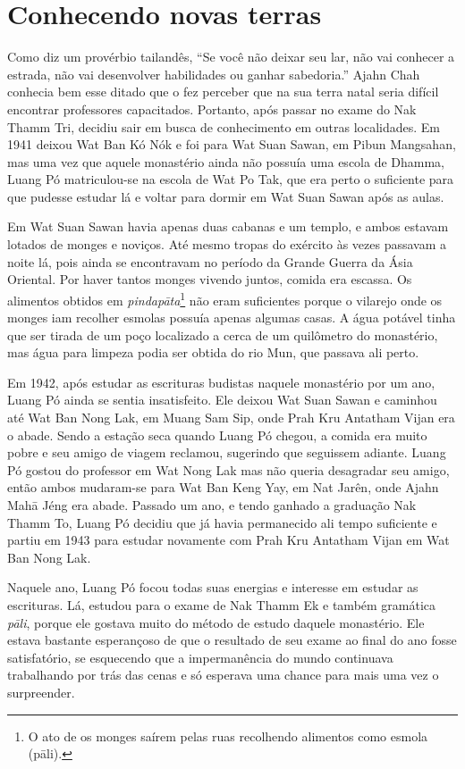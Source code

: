 \chapter{Conhecendo novas terras}

Como diz um provérbio tailandês, ``Se você não deixar seu lar, não vai
conhecer a estrada, não vai desenvolver habilidades ou ganhar
sabedoria.'' Ajahn Chah conhecia bem esse ditado que o fez perceber que
na sua terra natal seria difícil encontrar professores capacitados.
Portanto, após passar no exame do Nak Thamm Tri, decidiu sair em busca
de conhecimento em outras localidades. Em 1941 deixou Wat Ban Kó Nók e
foi para Wat Suan Sawan, em Pibun Mangsahan, mas uma vez que aquele
monastério ainda não possuía uma escola de Dhamma, Luang Pó
matriculou-se na escola de Wat Po Tak, que era perto o suficiente para
que pudesse estudar lá e voltar para dormir em Wat Suan Sawan após as
aulas.

Em Wat Suan Sawan havia apenas duas cabanas e um templo, e ambos estavam
lotados de monges e noviços. Até mesmo tropas do exército às vezes
passavam a noite lá, pois ainda se encontravam no período da Grande
Guerra da Ásia Oriental. Por haver tantos monges vivendo juntos, comida
era escassa. Os alimentos obtidos em \emph{pindapāta}\footnote{O ato de
  os monges saírem pelas ruas recolhendo alimentos como esmola (pāli).}
não eram suficientes porque o vilarejo onde os monges iam recolher
esmolas possuía apenas algumas casas. A água potável tinha que ser
tirada de um poço localizado a cerca de um quilômetro do monastério, mas
água para limpeza podia ser obtida do rio Mun, que passava ali perto.

Em 1942, após estudar as escrituras budistas naquele monastério por um
ano, Luang Pó ainda se sentia insatisfeito. Ele deixou Wat Suan Sawan e
caminhou até Wat Ban Nong Lak, em Muang Sam Sip, onde Prah Kru Antatham
Vijan era o abade. Sendo a estação seca quando Luang Pó chegou, a comida
era muito pobre e seu amigo de viagem reclamou, sugerindo que seguissem
adiante. Luang Pó gostou do professor em Wat Nong Lak mas não queria
desagradar seu amigo, então ambos mudaram-se para Wat Ban Keng Yay, em
Nat Jarên, onde Ajahn Mahā Jéng era abade. Passado um ano, e tendo
ganhado a graduação Nak Thamm To, Luang Pó decidiu que já havia
permanecido ali tempo suficiente e partiu em 1943 para estudar novamente
com Prah Kru Antatham Vijan em Wat Ban Nong Lak.

Naquele ano, Luang Pó focou todas suas energias e interesse em estudar
as escrituras. Lá, estudou para o exame de Nak Thamm Ek e também
gramática \emph{pāli}, porque ele gostava muito do método de estudo
daquele monastério. Ele estava bastante esperançoso de que o resultado
de seu exame ao final do ano fosse satisfatório, se esquecendo que a
impermanência do mundo continuava trabalhando por trás das cenas e só
esperava uma chance para mais uma vez o surpreender.


